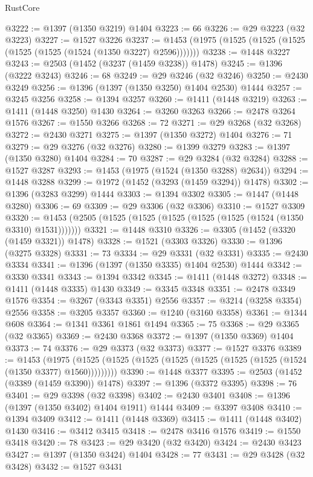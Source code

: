 \begin{lexlean}{RustCore}
\begin{coremodule}
@3222 := @1397 (@1350 @3219) @1404
@3223 := 66
@3226 := @29 @3223 (@32 @3223)
@3227 := @1527 @3226
@3237 := @1453 (@1975 (@1525 (@1525 (@1525 (@1525 (@1525 (@1524 (@1350 @3227) @2596)))))))
@3238 := @1448 @3227
@3243 := @2503 (@1452 (@3237 (@1459 @3238)) @1478)
@3245 := @1396 (@3222 @3243)
@3246 := 68
@3249 := @29 @3246 (@32 @3246)
@3250 := @2430 @3249
@3256 := @1396 (@1397 (@1350 @3250) @1404 @2530) @1444
@3257 := @3245 @3256
@3258 := @1394 @3257
@3260 := @1411 (@1448 @3219)
@3263 := @1411 (@1448 @3250) @1430
@3264 := @3260 @3263
@3266 := @2478 @3264 @1576
@3267 := @1550 @3266
@3268 := 72
@3271 := @29 @3268 (@32 @3268)
@3272 := @2430 @3271
@3275 := @1397 (@1350 @3272) @1404
@3276 := 71
@3279 := @29 @3276 (@32 @3276)
@3280 := @1399 @3279
@3283 := @1397 (@1350 @3280) @1404
@3284 := 70
@3287 := @29 @3284 (@32 @3284)
@3288 := @1527 @3287
@3293 := @1453 (@1975 (@1524 (@1350 @3288) @2634))
@3294 := @1448 @3288
@3299 := @1972 (@1452 (@3293 (@1459 @3294)) @1478)
@3302 := @1396 (@3283 @3299) @1444
@3303 := @1394 @3302
@3305 := @1447 (@1448 @3280)
@3306 := 69
@3309 := @29 @3306 (@32 @3306)
@3310 := @1527 @3309
@3320 := @1453 (@2505 (@1525 (@1525 (@1525 (@1525 (@1525 (@1524 (@1350 @3310) @1531)))))))
@3321 := @1448 @3310
@3326 := @3305 (@1452 (@3320 (@1459 @3321)) @1478)
@3328 := @1521 (@3303 @3326)
@3330 := @1396 (@3275 @3328)
@3331 := 73
@3334 := @29 @3331 (@32 @3331)
@3335 := @2430 @3334
@3341 := @1396 (@1397 (@1350 @3335) @1404 @2530) @1444
@3342 := @3330 @3341
@3343 := @1394 @3342
@3345 := @1411 (@1448 @3272)
@3348 := @1411 (@1448 @3335) @1430
@3349 := @3345 @3348
@3351 := @2478 @3349 @1576
@3354 := @3267 (@3343 @3351) @2556
@3357 := @3214 (@3258 @3354) @2556
@3358 := @3205 @3357
@3360 := @1240 (@3160 @3358)
@3361 := @1344 @608
@3364 := @1341 @3361 @1861 @1494
@3365 := 75
@3368 := @29 @3365 (@32 @3365)
@3369 := @2430 @3368
@3372 := @1397 (@1350 @3369) @1404
@3373 := 74
@3376 := @29 @3373 (@32 @3373)
@3377 := @1527 @3376
@3389 := @1453
    (@1975 (@1525 (@1525 (@1525 (@1525 (@1525 (@1525 (@1525 (@1524 (@1350 @3377) @1560)))))))))
@3390 := @1448 @3377
@3395 := @2503 (@1452 (@3389 (@1459 @3390)) @1478)
@3397 := @1396 (@3372 @3395)
@3398 := 76
@3401 := @29 @3398 (@32 @3398)
@3402 := @2430 @3401
@3408 := @1396 (@1397 (@1350 @3402) @1404 @1911) @1444
@3409 := @3397 @3408
@3410 := @1394 @3409
@3412 := @1411 (@1448 @3369)
@3415 := @1411 (@1448 @3402) @1430
@3416 := @3412 @3415
@3418 := @2478 @3416 @1576
@3419 := @1550 @3418
@3420 := 78
@3423 := @29 @3420 (@32 @3420)
@3424 := @2430 @3423
@3427 := @1397 (@1350 @3424) @1404
@3428 := 77
@3431 := @29 @3428 (@32 @3428)
@3432 := @1527 @3431

\end{coremodule}
\end{lexlean}
